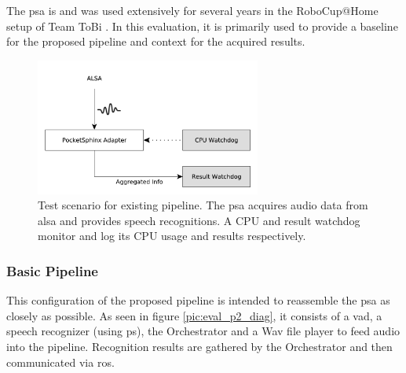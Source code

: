 The \gls{psa} is and was used extensively for several years in the RoboCup@Home setup of Team ToBi \cite{ToBi}.
In this evaluation, it is primarily used to provide a baseline for the proposed pipeline and context for the acquired results.

\begin{figure}[]
	\centering
	\includegraphics[width=0.66\textwidth]{diagrams/eval_pipeline_1.pdf}
	\caption{Test scenario for existing pipeline.
		The \gls{psa} acquires audio data from \gls{alsa} and provides speech recognitions.
		A CPU and result watchdog monitor and log its CPU usage and results respectively.}
	\label{pic:eval_p1_diag}
\end{figure}

\subsubsection{Basic Pipeline}
\label{eval:dataset:pipeline:baseline}
This configuration of the proposed pipeline is intended to reassemble the \gls{psa} as closely as possible.
As seen in figure \ref{pic:eval_p2_diag}, it consists of a \gls{vad}, a speech recognizer (using \gls{ps}), the Orchestrator and a Wav file player to feed audio into the pipeline.
Recognition results are gathered by the Orchestrator and then communicated via \gls{ros}.

